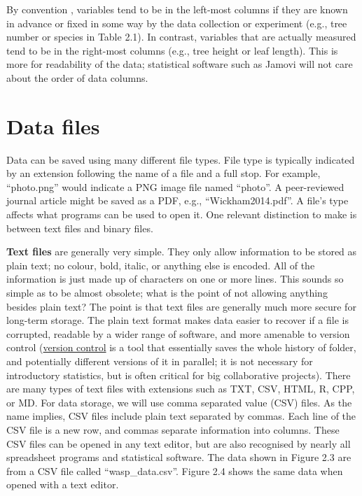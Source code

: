 \documentclass[
]{scrbook}
\begin{document}
By convention \citep{Wickham2014}, variables tend to be in the left-most columns if they are known in advance or fixed in some way by the data collection or experiment (e.g., tree number or species in Table 2.1).
In contrast, variables that are actually measured tend to be in the right-most columns (e.g., tree height or leaf length).
This is more for readability of the data; statistical software such as Jamovi will not care about the order of data columns.

\hypertarget{data-files}{%
\section{Data files}\label{data-files}}

Data can be saved using many different file types.
File type is typically indicated by an extension following the name of a file and a full stop.
For example, ``photo.png'' would indicate a PNG image file named ``photo''.
A peer-reviewed journal article might be saved as a PDF, e.g., ``Wickham2014.pdf''.
A file's type affects what programs can be used to open it.
One relevant distinction to make is between text files and binary files.

\textbf{Text files} are generally very simple.
They only allow information to be stored as plain text; no colour, bold, italic, or anything else is encoded.
All of the information is just made up of characters on one or more lines.
This sounds so simple as to be almost obsolete; what is the point of not allowing anything besides plain text?
The point is that text files are generally much more secure for long-term storage.
The plain text format makes data easier to recover if a file is corrupted, readable by a wider range of software, and more amenable to version control (\href{https://bradduthie.github.io/version_control/vc_notes.html}{version control} is a tool that essentially saves the whole history of folder, and potentially different versions of it in parallel; it is not necessary for introductory statistics, but is often critical for big collaborative projects).
There are many types of text files with extensions such as TXT, CSV, HTML, R, CPP, or MD.
For data storage, we will use comma separated value (CSV) files.
As the name implies, CSV files include plain text separated by commas.
Each line of the CSV file is a new row, and commas separate information into columns.
These CSV files can be opened in any text editor, but are also recognised by nearly all spreadsheet programs and statistical software.
The data shown in Figure 2.3 are from a CSV file called ``wasp\_data.csv''.
Figure 2.4 shows the same data when opened with a text editor.
\end{document}
